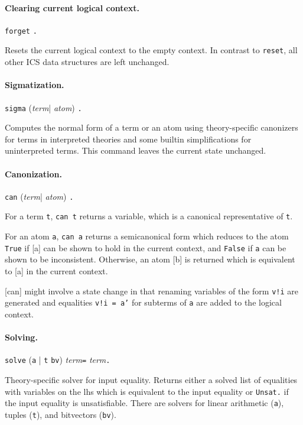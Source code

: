 \documentclass[12pt]{article}
\newcommand{\term}{\textit{term}}
\newcommand{\atom}{\textit{atom}}
\begin{document}
\paragraph{Clearing current logical context.}
  \begin{center}
  \texttt{forget} \texttt{.}
  \end{center}
Resets the current logical context to the empty 
context. In contrast to \texttt{reset}, all other
ICS data structures are left unchanged.


\paragraph{Sigmatization.}
  \begin{center}
  \texttt{sigma} (\term | \atom) \texttt{.}
  \end{center}
Computes the normal form of a term or an atom using
theory-specific canonizers for terms in interpreted
theories and some builtin simplifications for 
uninterpreted terms. This command leaves the 
current state unchanged.

\paragraph{Canonization.}
  \begin{center}
  \texttt{can} (\term | \atom) \texttt{.}
  \end{center}
For a term \texttt{t}, \texttt{can t} returns a
variable, which is a canonical representative of 
\texttt{t}.

For an atom \texttt{a}, \texttt{can a} returns a semicanonical 
form which reduces to the atom \texttt{True} if [a] can be shown
to hold in the current context, and \texttt{False} if \texttt{a}
can be shown to be inconsistent.  Otherwise, an atom
[b] is returned which is equivalent to [a] in the current
context.

[can] might involve a state change in that renaming
variables of the form \texttt{v!i} are generated and equalities
\texttt{v!i = a'} for subterms of \texttt{a} are added to the
logical context.

\paragraph{Solving.}
  \begin{center}
  \texttt{solve} (\texttt{a} | \texttt{t} \texttt{bv}) \term \texttt{=} \term  \texttt{.}
  \end{center}
Theory-specific solver for input equality. Returns either a solved 
list of equalities with variables on the lhs which is equivalent
to the input equality or \texttt{Unsat.} if the input equality is
unsatisfiable. There are solvers for linear arithmetic (\texttt{a}), 
tuples (\texttt{t}), and bitvectors (\texttt{bv}).
\end{document}

